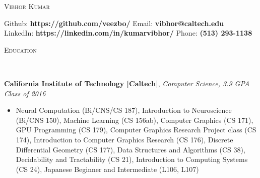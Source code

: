 \documentclass[9pt]{article}
\newenvironment{changemargin}[2]{%
  \begin{list}{}{%
    \setlength{\topsep}{0pt}%
    \setlength{\leftmargin}{#1}%
    \setlength{\rightmargin}{#2}%
    \setlength{\listparindent}{\parindent}%
    \setlength{\itemindent}{\parindent}%
    \setlength{\parsep}{\parskip}%
  }%
  \item[]}{\end{list}
}
\newcommand{\lineover}{
	\begin{changemargin}{-0.05in}{-0.05in}
		\vspace*{-8pt}
		\hrulefill \\
		\vspace*{-2pt}
	\end{changemargin}
}
\newcommand{\header}[1]{
	\begin{changemargin}{-0.5in}{-0.5in}
		\scshape{#1}\\
  	\lineover
	\end{changemargin}
}
\newenvironment{body} {
	\vspace*{-16pt}
	\begin{changemargin}{-0.25in}{-0.5in}
  }	
	{\end{changemargin}
}
\begin{document}
\begin{center} 
	{\Large \scshape Vibhor Kumar} 
\end{center}
	\vspace*{-2pt}
\hspace{-12mm} Github: \hspace{3mm} \textbf{https://github.com/veezbo/}
\hspace{46mm} Email: \hspace{0.1mm} \textbf{vibhor@caltech.edu} \\
\vspace*{1pt}
\hspace{-12mm} LinkedIn: \hspace{0.25mm} \textbf{https://linkedin.com/in/kumarvibhor/} \hspace{26.75mm} Phone: \textbf{(513) 293-1138}\\
\vspace{1pt}
\smallskip
\header{Education}
\begin{body}
	\vspace{15pt}
	\textbf{California Institute of Technology [Caltech]}{}, \emph{Computer Science, 3.9 GPA} \hfill \emph{Class of 2016}{} \\
	\begin{itemize} \itemsep -0pt
	\item Neural Computation (Bi/CNS/CS 187), Introduction to Neuroscience (Bi/CNS 150), Machine Learning (CS 156ab), Computer Graphics (CS 171), GPU Programming (CS 179), Computer Graphics Research Project class (CS 174), Introduction to Computer Graphics Research (CS 176), Discrete Differential Geometry (CS 177), Data Structures and Algorithms (CS 38), Decidability and Tractability (CS 21), Introduction to Computing Systems (CS 24), Japanese Beginner and Intermediate (L106, L107)
	\end{itemize}
\end{body}

\smallskip
\vspace*{-3pt}
\end{document}
